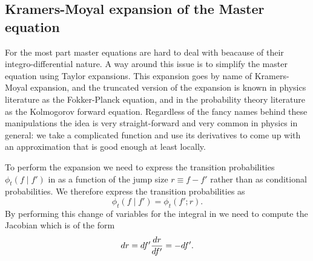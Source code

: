\subsection{Kramers-Moyal expansion of the Master equation}

For the most part master equations are hard to deal with beacause of their
integro-differential nature. A way around this issue is to simplify the master
equation using Taylor expansions. This expansion goes by name of Kramers-Moyal
expansion, and the truncated version of the expansion is known in physics
literature as the Fokker-Planck equation, and in the probability theory
literature as the Kolmogorov forward equation. Regardless of the fancy names
behind these manipulations the idea is very straight-forward and very common in
physics in general: we take a complicated function and use its derivatives to
come up with an approximation that is good enough at least locally.

To perform the expansion we need to express the transition probabilities
$\phi_t(f \mid f')$ in  as a function of the jump size
$r \equiv f - f'$ rather than as conditional probabilities. We therefore
express the transition probabilities as
\begin{equation}
  \phi_t(f \mid f') = \phi_t(f'; r).
  \label{eq_trans_jump_size}
\end{equation}
By performing this change of variables for the integral in
 we need to compute the Jacobian which is of the form
\begin{equation}
  dr = df' {dr \over df'} = -df'.
\end{equation}


